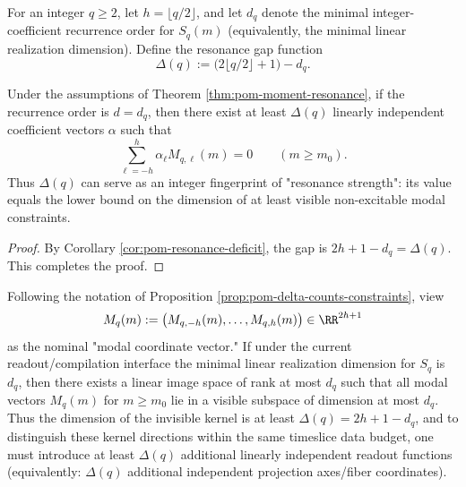 \begin{definition}\label{def:pom-resonance-gap-delta}
For an integer \(q\ge 2\), let \(h=\lfloor q/2\rfloor\), and let \(d_q\) denote the minimal integer-coefficient recurrence order for \(S_q(m)\) (equivalently, the minimal linear realization dimension). Define the resonance gap function
$$
\Delta(q):=\bigl(2\lfloor q/2\rfloor+1\bigr)-d_q.
$$
\end{definition}

\begin{proposition}\label{prop:pom-delta-counts-constraints}
Under the assumptions of Theorem \ref{thm:pom-moment-resonance}, if the recurrence order is \(d=d_q\), then there exist at least \(\Delta(q)\) linearly independent coefficient vectors \(\alpha\) such that
\[
\sum_{\ell=-h}^{h}\alpha_\ell M_{q,\ell}(m)=0\qquad(m\ge m_0).
\]
Thus \(\Delta(q)\) can serve as an integer fingerprint of "resonance strength": its value equals the lower bound on the dimension of at least visible non-excitable modal constraints.
\end{proposition}

\begin{proof}
By Corollary \ref{cor:pom-resonance-deficit}, the gap is \(2h+1-d_q=\Delta(q)\). This completes the proof.
\end{proof}

\begin{corollary}\label{cor:pom-delta-min-extra-readouts}
Following the notation of Proposition \ref{prop:pom-delta-counts-constraints}, view
\[
M_q(m):=\bigl(M_{q,-h}(m),\ldots,M_{q,h}(m)\bigr)\in\RR^{2h+1}
\]
as the nominal "modal coordinate vector." If under the current readout/compilation interface the minimal linear realization dimension for \(S_q\) is \(d_q\), then
there exists a linear image space of rank at most \(d_q\) such that all modal vectors \(M_q(m)\) for \(m\ge m_0\) lie in a visible subspace of dimension at most \(d_q\).
Thus the dimension of the invisible kernel is at least
\(
\Delta(q)=2h+1-d_q
\),
and to distinguish these kernel directions within the same timeslice data budget, one must introduce at least \(\Delta(q)\) additional linearly independent readout functions
(equivalently: \(\Delta(q)\) additional independent projection axes/fiber coordinates).
\end{corollary}

